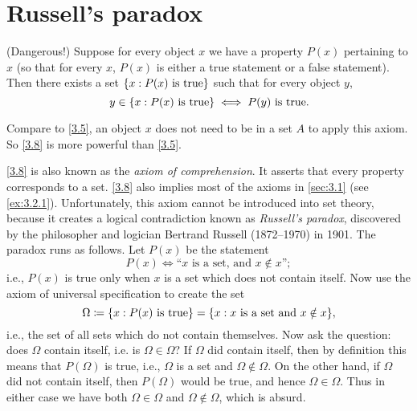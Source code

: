 \section{Russell's paradox}\label{sec:3.2}

\begin{ax}\label{3.8}
  (Dangerous!)
  Suppose for every object \(x\) we have a property \(P(x)\) pertaining to \(x\) (so that for every \(x\), \(P(x)\) is either a true statement or a false statement).
  Then there exists a set \(\left\lbrace x : P(x) \text{ is true}\right\rbrace\) such that for every object \(y\),
  \[
    y \in \left\lbrace x : P(x) \text{ is true}\right\rbrace \iff P(y) \text{ is true}.
  \]
\end{ax}

\begin{note}
  Compare to \cref{3.5}, an object \(x\) does not need to be in a set \(A\) to apply this axiom.
  So \cref{3.8} is more powerful than \cref{3.5}.
\end{note}

\begin{note}
  \cref{3.8} is also known as the \emph{axiom of comprehension}.
  It asserts that every property corresponds to a set.
  \cref{3.8} also implies most of the axioms in \cref{sec:3.1} (see \cref{ex:3.2.1}).
  Unfortunately, this axiom cannot be introduced into set theory, because it creates a logical contradiction known as \emph{Russell's paradox}, discovered by the philosopher and logician Bertrand Russell (1872--1970) in 1901.
  The paradox runs as follows.
  Let \(P(x)\) be the statement
  \[
    P(x) \iff \text{``\(x\) is a set, and \(x \notin x\)''};
  \]
  i.e., \(P(x)\) is true only when \(x\) is a set which does not contain itself.
  Now use the axiom of universal specification to create the set
  \[
    \Omega \coloneqq \set{x : P(x) \text{ is true}} = \set{x : x \text{ is a set and } x \notin x},
  \]
  i.e., the set of all sets which do not contain themselves.
  Now ask the question: does \(\Omega\) contain itself, i.e. is \(\Omega \in \Omega\)?
  If \(\Omega\) did contain itself, then by definition this means that \(P(\Omega)\) is true, i.e., \(\Omega\) is a set and \(\Omega \notin \Omega\).
  On the other hand, if \(\Omega\) did not contain itself, then \(P(\Omega)\) would be true, and hence \(\Omega \in \Omega\).
  Thus in either case we have both \(\Omega \in \Omega\) and \(\Omega \notin \Omega\), which is absurd.
\end{note}

